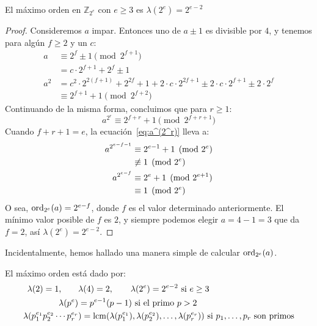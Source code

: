   \begin{lemma}
    \label{lem:lambda-2^e}
    El máximo orden en \(\mathbb{Z}_{2^e}\) con \(e \ge 3\)
    es \(\lambda(2^e) = 2^{e - 2}\)
  \end{lemma}
  \begin{proof}
    Consideremos \(a\) impar.
    Entonces uno de \(a \pm 1\) es divisible por \(4\),
    y tenemos para algún \(f \ge 2\) y un \(c\):
    \begin{align*}
      a
	&\equiv 2^f \pm 1 \pmod{2^{f + 1}} \\
	&=	c \cdot 2^{f + 1} + 2^f \pm 1  \\
      a^2
	&=	c^2 \cdot 2^{2 (f + 1)} + 2^{2 f} + 1
		  + 2 \cdot c \cdot 2^{2 f + 1}
		  \pm 2 \cdot c \cdot 2^{f + 1}
		  \pm 2 \cdot 2^f		 \\
	&\equiv 2^{f + 1} + 1 \pmod{2^{f + 2}}
    \end{align*}
    Continuando de la misma forma,
    concluimos que para \(r \ge 1\):
    \begin{equation}
      \label{eq:a^(2^r)}
      a^{2^r}
	\equiv 2^{f + r} + 1 \pmod{2^{f + r + 1}}
    \end{equation}
    Cuando \(f + r + 1 = e\),
    la ecuación~\eqref{eq:a^(2^r)} lleva a:
    \begin{align*}
      a^{2^{e - f - 1}}
	&\equiv		  2^{e - 1} + 1 \pmod{2^e} \\
	&\centernot\equiv 1		\pmod{2^e} \\
      a^{2^{e - f}}
	&\equiv	    2^e + 1 \pmod{2^{e + 1}} \\
	&\equiv	    1	    \pmod{2^e}
    \end{align*}
    O sea,
    \(\operatorname{ord}_{2^e} (a) = 2^{e - f}\),
    donde \(f\) es el valor determinado anteriormente.
    El mínimo valor posible de \(f\) es \(2\),
    y siempre podemos elegir \(a = 4 - 1 = 3\) que da \(f = 2\),
    así \(\lambda(2^e) = 2^{e - 2}\).
  \end{proof}
  Incidentalmente,
  hemos hallado una manera simple de calcular \(\operatorname{ord}_{2^e}(a)\).
  \begin{theorem}
    \label{theo:max-orden-Z*}
    El máximo orden está dado por:
    \begin{align*}
      \lambda(2) = 1, \qquad
	&\lambda(4) = 2,
	  \qquad \lambda(2^e) = 2^{e - 2} \text{\ si\ } e \ge 3 \\
      \lambda(p^e)
	&= p^{e - 1} (p - 1) \text{\ si el primo\ } p > 2 \\
      \lambda(p_1^{e_1} p_2^{e_2} \dotsm p_r^{e_r}&)
	 = \operatorname{lcm}(\lambda(p_1^{e_1}), \lambda(p_2^{e_2}), \dotsc,
		\lambda(p_r^{e_r}))
	   \text{\ si \(p_1, \dotsc, p_r\) son primos}
    \end{align*}
  \end{theorem}

